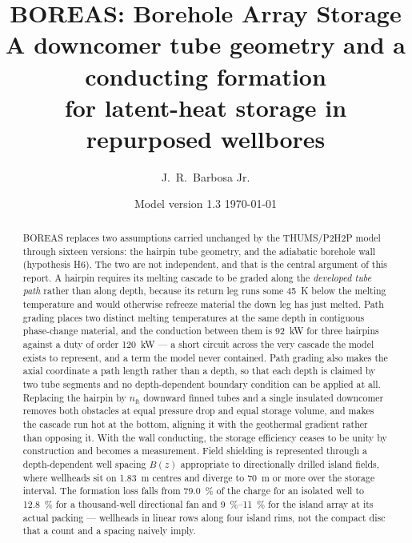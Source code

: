 \documentclass[11pt]{article}
\title{\textbf{BOREAS: Borehole Array Storage}\\[8pt]
\large A downcomer tube geometry and a conducting formation\\
for latent-heat storage in repurposed wellbores}
\author{J.\ R.\ Barbosa Jr.}
\date{Model version 1.3 \quad\textbullet\quad \today}
\newcommand{\nft}{\ensuremath{n_{\mathrm{ft}}}}
\begin{document}
\maketitle

\begin{abstract}
BOREAS replaces two assumptions carried unchanged by the THUMS/P2H2P model
through sixteen versions: the hairpin tube geometry, and the adiabatic
borehole wall (hypothesis H6). The two are not independent, and that is the
central argument of this report. A hairpin requires its melting cascade to be
graded along the \emph{developed tube path} rather than along depth, because
its return leg runs some \SI{45}{\kelvin} below the melting temperature and
would otherwise refreeze material the down leg has just melted. Path grading
places two distinct melting temperatures at the same depth in contiguous
phase-change material, and the conduction between them is \SI{92}{\kilo\watt}
for three hairpins against a duty of order \SI{120}{\kilo\watt} --- a short
circuit across the very cascade the model exists to represent, and a term the
model never contained. Path grading also makes the axial coordinate a path
length rather than a depth, so that each depth is claimed by two tube
segments and no depth-dependent boundary condition can be applied at all.
Replacing the hairpin by $\nft$ downward finned tubes and a single insulated
downcomer removes both obstacles at equal pressure drop and equal storage
volume, and makes the cascade run hot at the bottom, aligning it with the
geothermal gradient rather than opposing it. With the wall conducting, the
storage efficiency ceases to be unity by construction and becomes a
measurement. Field shielding is represented through a depth-dependent well
spacing $B(z)$ appropriate to directionally drilled island fields, where
wellheads sit on \SI{1.83}{\metre} centres and diverge to \SI{70}{\metre} or
more over the storage interval. The formation loss falls from
\SI{79.0}{\percent} of the charge for an isolated well to \SI{12.8}{\percent}
for a thousand-well directional fan and \SIrange{9}{11}{\percent} for the
island array at its actual packing --- wellheads in linear rows along four
island rims, not the compact disc that a count and a spacing naively imply.
\end{abstract}

\tableofcontents
\newpage












\end{document}
